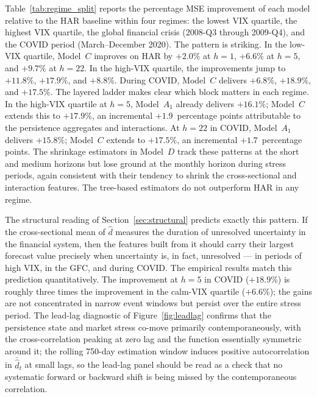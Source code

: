 \documentclass[11pt,a4paper]{article}
\newcommand{\dhat}{\hat d}
\begin{document}
Table~\ref{tab:regime_split} reports the percentage MSE improvement of
each model relative to the HAR baseline within four regimes: the lowest
VIX quartile, the highest VIX quartile, the global financial crisis
(2008-Q3 through 2009-Q4), and the COVID period (March--December 2020).
The pattern is striking. In the low-VIX quartile, Model~$C$ improves on
HAR by $+2.0\%$ at $h=1$, $+6.6\%$ at $h=5$, and $+9.7\%$ at $h=22$.
In the high-VIX quartile, the improvements jump to $+11.8\%$,
$+17.9\%$, and $+8.8\%$. During COVID, Model~$C$ delivers $+6.8\%$,
$+18.9\%$, and $+17.5\%$. The layered ladder makes clear which block
matters in each regime. In the high-VIX quartile at $h=5$, Model~$A_1$
already delivers $+16.1\%$; Model~$C$ extends this to $+17.9\%$, an
incremental $+1.9$~percentage points attributable to the persistence
aggregates and interactions. At $h=22$ in COVID, Model~$A_1$ delivers
$+15.8\%$; Model~$C$ extends to $+17.5\%$, an incremental
$+1.7$~percentage points. The shrinkage estimators in Model~$D$ track
these patterns at the short and medium horizons but lose ground at the
monthly horizon during stress periods, again consistent with their
tendency to shrink the cross-sectional and interaction features. The
tree-based estimators do not outperform HAR in any regime.



The structural reading of Section~\ref{sec:structural} predicts exactly
this pattern. If the cross-sectional mean of $\dhat$ measures the
duration of unresolved uncertainty in the financial system, then the
features built from it should carry their largest forecast value
precisely when uncertainty is, in fact, unresolved --- in periods of
high VIX, in the GFC, and during COVID. The empirical results match
this prediction quantitatively. The improvement at $h=5$ in COVID
($+18.9\%$) is roughly three times the improvement in the calm-VIX
quartile ($+6.6\%$); the gains are not concentrated in narrow event
windows but persist over the entire stress period. The lead-lag
diagnostic of Figure~\ref{fig:leadlag} confirms that the persistence
state and market stress co-move primarily contemporaneously, with the
cross-correlation peaking at zero lag and the function essentially
symmetric around it; the rolling 750-day estimation window induces
positive autocorrelation in $\bar{\hat d}_t$ at small lags, so the
lead-lag panel should be read as a check that no systematic forward or
backward shift is being missed by the contemporaneous correlation.
\end{document}
